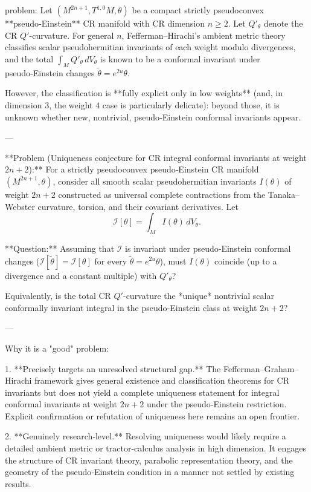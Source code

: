 problem:  
Let \((M^{2n+1},T^{1,0}M,\theta)\) be a compact strictly pseudoconvex **pseudo‑Einstein** CR manifold with CR dimension \(n\ge2\).  
Let \(Q'_\theta\) denote the CR \(Q'\)-curvature.  For general \(n\), Fefferman–Hirachi’s ambient metric theory classifies scalar pseudohermitian invariants of each weight modulo divergences, and the total \(\int_M Q'_\theta\,dV_\theta\) is known to be a conformal invariant under pseudo‑Einstein changes \(\tilde{\theta}=e^{2u}\theta\).

However, the classification is **fully explicit only in low weights** (and, in dimension \(3\), the weight \(4\) case is particularly delicate):  beyond those, it is unknown whether new, nontrivial, pseudo‑Einstein conformal invariants appear.

---

**Problem (Uniqueness conjecture for CR integral conformal invariants at weight \(2n+2\)):**  
For a strictly pseudoconvex pseudo‑Einstein CR manifold \((M^{2n+1},\theta)\), consider all smooth scalar pseudohermitian invariants \(I(\theta)\) of weight \(2n+2\) constructed as universal complete contractions from the Tanaka–Webster curvature, torsion, and their covariant derivatives.  
Let  
\[
\mathcal{I}[\theta]=\int_M I(\theta)\,dV_\theta.
\]
  
**Question:**  
Assuming that \(\mathcal{I}\) is invariant under pseudo‑Einstein conformal changes (\(\mathcal{I}[\tilde{\theta}]=\mathcal{I}[\theta]\) for every \(\tilde{\theta}=e^{2u}\theta\)), must \(I(\theta)\) coincide (up to a divergence and a constant multiple) with \(Q'_\theta\)?  

Equivalently, is the total CR \(Q'\)-curvature the *unique* nontrivial scalar conformally invariant integral in the pseudo‑Einstein class at weight \(2n+2\)?  

---

Why it is a "good" problem:

1. **Precisely targets an unresolved structural gap.**  
   The Fefferman–Graham–Hirachi framework gives general existence and classification theorems for CR invariants but does not yield a complete uniqueness statement for integral conformal invariants at weight \(2n+2\) under the pseudo‑Einstein restriction.  Explicit confirmation or refutation of uniqueness here remains an open frontier.

2. **Genuinely research‑level.**  
   Resolving uniqueness would likely require a detailed ambient metric or tractor‑calculus analysis in high dimension. It engages the structure of CR invariant theory, parabolic representation theory, and the geometry of the pseudo‑Einstein condition in a manner not settled by existing results.

